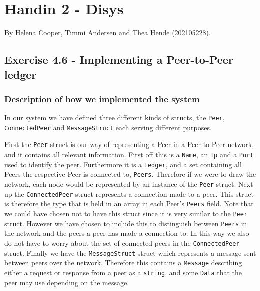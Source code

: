 \documentclass[
  paper=a4,
  ,captions=tableheading
]{scrartcl}
\newcommand{\passthrough}[1]{#1}
\begin{document}



\hypertarget{handin-2---disys}{%
\section{Handin 2 - Disys}\label{handin-2---disys}}

By Helena Cooper, Timmi Andersen and Thea Hende (202105228).

\hypertarget{exercise-4.6---implementing-a-peer-to-peer-ledger}{%
\subsection{Exercise 4.6 - Implementing a Peer-to-Peer
ledger}\label{exercise-4.6---implementing-a-peer-to-peer-ledger}}

\hypertarget{description-of-how-we-implemented-the-system}{%
\subsubsection{\texorpdfstring{\textbf{Description of how we implemented
the
system}}{Description of how we implemented the system}}\label{description-of-how-we-implemented-the-system}}

In our system we have defined three different kinds of structs, the
\passthrough{\lstinline!Peer!}, \passthrough{\lstinline!ConnectedPeer!}
and \passthrough{\lstinline!MessageStruct!} each serving different
purposes.

First the \passthrough{\lstinline!Peer!} struct is our way of
representing a Peer in a Peer-to-Peer network, and it contains all
relevant information. First off this is a
\passthrough{\lstinline!Name!}, an \passthrough{\lstinline!Ip!} and a
\passthrough{\lstinline!Port!} used to identify the peer. Furthermore it
is a \passthrough{\lstinline!Ledger!}, and a set containing all Peers
the respective Peer is connected to, \passthrough{\lstinline!Peers!}.
Therefore if we were to draw the network, each node would be represented
by an instance of the \passthrough{\lstinline!Peer!} struct. Next up the
\passthrough{\lstinline!ConnectedPeer!} struct represents a connection
made to a peer. This struct is therefore the type that is held in an
array in each Peer's \passthrough{\lstinline!Peers!} field. Note that we
could have chosen not to have this struct since it is very similar to
the \passthrough{\lstinline!Peer!} struct. However we have chosen to
include this to distinguish between \passthrough{\lstinline!Peers!} in
the network and the peers a peer has made a connection to. In this way
we also do not have to worry about the set of connected peers in the
\passthrough{\lstinline!ConnectedPeer!} struct. Finally we have the
\passthrough{\lstinline!MessageStruct!} struct which represents a
message sent between peers over the network. Therefore this contains a
\passthrough{\lstinline!Message!} describing either a request or
response from a peer as a \passthrough{\lstinline!string!}, and some
\passthrough{\lstinline!Data!} that the peer may use depending on the
message.
\end{document}
